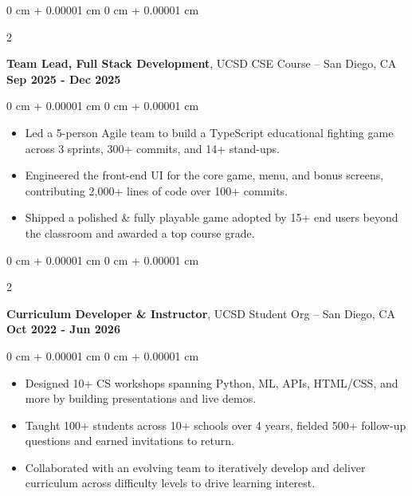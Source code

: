 \documentclass[10pt, letterpaper]{article}
\newenvironment{highlights}{
    \begin{itemize}[
        topsep=0.10 cm,
        parsep=0.10 cm,
        partopsep=0pt,
        itemsep=0pt,
        leftmargin=0 cm + 10pt
    ]
}{
    \end{itemize}
} %
\newenvironment{onecolentry}{
    \begin{adjustwidth}{
        0 cm + 0.00001 cm
    }{
        0 cm + 0.00001 cm
    }
}{
    \end{adjustwidth}
} %
\newenvironment{twocolentry}[2][]{
    \onecolentry%
    \def\secondColumn{#2}
    \setcolumnwidth{\fill, 7.0 cm}
    \begin{paracol}{2}
}{
    \switchcolumn\raggedleft\secondColumn%
    \end{paracol}
    \endonecolentry%
} %
\begin{document}
        \vspace{0.10 cm}
        
        \begin{twocolentry}{
            {\color{secondaryColor}\textbf{Sep 2025 - Dec 2025}}
        }
            \textbf{Team Lead, Full Stack Development}, UCSD CSE Course -- San Diego, CA\end{twocolentry}

        \vspace{0.10 cm}
        \begin{onecolentry}
            \begin{highlights}
                \item Led a 5-person Agile team to build a TypeScript educational fighting game across 3 sprints, 300+ commits, and 14+ stand-ups.
                \item Engineered the front-end UI for the core game, menu, and bonus screens, contributing 2,000+ lines of code over 100+ commits.
                \item Shipped a polished \& fully playable game adopted by 15+ end users beyond the classroom and awarded a top course grade.
            \end{highlights}
        \end{onecolentry}


        \vspace{0.2 cm}

        \begin{twocolentry}{
            {\color{secondaryColor}\textbf{Oct 2022 - Jun 2026}}
        }
            \textbf{Curriculum Developer \& Instructor}, UCSD Student Org -- San Diego, CA\end{twocolentry}

        \vspace{0.10 cm}
        \begin{onecolentry}
            \begin{highlights}
                \item Designed 10+ CS workshops spanning Python, ML, APIs, HTML/CSS, and more by building presentations and live demos.
                \item Taught 100+ students across 10+ schools over 4 years, fielded 500+ follow-up questions and earned invitations to return.
                \item Collaborated with an evolving team to iteratively develop and deliver curriculum across difficulty levels to drive learning interest.  
            \end{highlights}
        \end{onecolentry}
    
\end{document}
